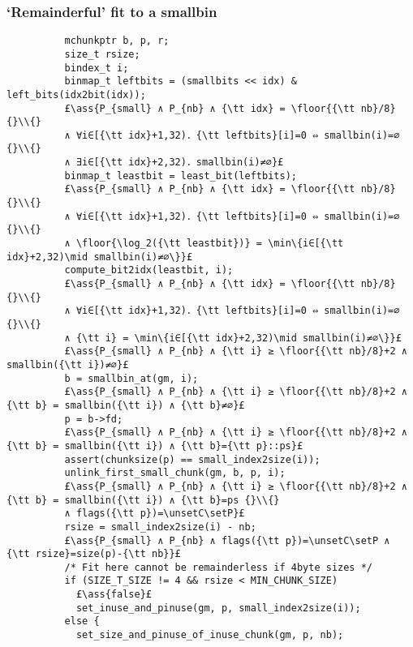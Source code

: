 \documentclass[10pt,a4paper,twoside]{report}
\makeatletter
\newcommand{\ml}[2][t]{\mbox{\mdseries\begin{tabular}[#1]{@{}L@{}}#2\end{tabular}}}
\newcommand{\ass}[1]{\ensuremath{{\color{blue}\left\{\ml[c]{#1}\right\}}}}
\renewcommand{\floor}[2][]{\left\lfloor{#2}\right\rfloor_{#1}}
\newcommand{\unsetC}{\raisebox{1.5pt}{$\triangledown$}}
\newcommand{\setP}{{\blacktriangle}}
\makeatother
\begin{document}
\subsubsection*{`Remainderful' fit to a smallbin}\label{sect:remainderful_fit_to_a_smallbin}

\begin{lstlisting}
          mchunkptr b, p, r;
          size_t rsize;
          bindex_t i;
          binmap_t leftbits = (smallbits << idx) & left_bits(idx2bit(idx));
          £\ass{P_{small} ∧ P_{nb} ∧ {\tt idx} = \floor{{\tt nb}/8} {}\\{}
          ∧ ∀i∈[{\tt idx}+1,32)．{\tt leftbits}[i]=0 ⇔ smallbin(i)=∅ {}\\{}
          ∧ ∃i∈[{\tt idx}+2,32)．smallbin(i)≠∅}£
          binmap_t leastbit = least_bit(leftbits);
          £\ass{P_{small} ∧ P_{nb} ∧ {\tt idx} = \floor{{\tt nb}/8} {}\\{}
          ∧ ∀i∈[{\tt idx}+1,32)．{\tt leftbits}[i]=0 ⇔ smallbin(i)=∅ {}\\{}
          ∧ \floor{\log_2({\tt leastbit})} = \min\{i∈[{\tt idx}+2,32)\mid smallbin(i)≠∅\}}£
          compute_bit2idx(leastbit, i);
          £\ass{P_{small} ∧ P_{nb} ∧ {\tt idx} = \floor{{\tt nb}/8} {}\\{}
          ∧ ∀i∈[{\tt idx}+1,32)．{\tt leftbits}[i]=0 ⇔ smallbin(i)=∅ {}\\{}
          ∧ {\tt i} = \min\{i∈[{\tt idx}+2,32)\mid smallbin(i)≠∅\}}£
          £\ass{P_{small} ∧ P_{nb} ∧ {\tt i} ≥ \floor{{\tt nb}/8}+2 ∧ smallbin({\tt i})≠∅}£
          b = smallbin_at(gm, i);
          £\ass{P_{small} ∧ P_{nb} ∧ {\tt i} ≥ \floor{{\tt nb}/8}+2 ∧ {\tt b} = smallbin({\tt i}) ∧ {\tt b}≠∅}£
          p = b->fd;
          £\ass{P_{small} ∧ P_{nb} ∧ {\tt i} ≥ \floor{{\tt nb}/8}+2 ∧ {\tt b} = smallbin({\tt i}) ∧ {\tt b}={\tt p}::ps}£
          assert(chunksize(p) == small_index2size(i));
          unlink_first_small_chunk(gm, b, p, i);
          £\ass{P_{small} ∧ P_{nb} ∧ {\tt i} ≥ \floor{{\tt nb}/8}+2 ∧ {\tt b} = smallbin({\tt i}) ∧ {\tt b}=ps {}\\{}
          ∧ flags({\tt p})=\unsetC\setP}£
          rsize = small_index2size(i) - nb;
          £\ass{P_{small} ∧ P_{nb} ∧ flags({\tt p})=\unsetC\setP ∧ {\tt rsize}=size(p)-{\tt nb}}£
          /* Fit here cannot be remainderless if 4byte sizes */
          if (SIZE_T_SIZE != 4 && rsize < MIN_CHUNK_SIZE)
            £\ass{false}£
            set_inuse_and_pinuse(gm, p, small_index2size(i));
          else {
            set_size_and_pinuse_of_inuse_chunk(gm, p, nb);

\end{lstlisting}
\end{document}
